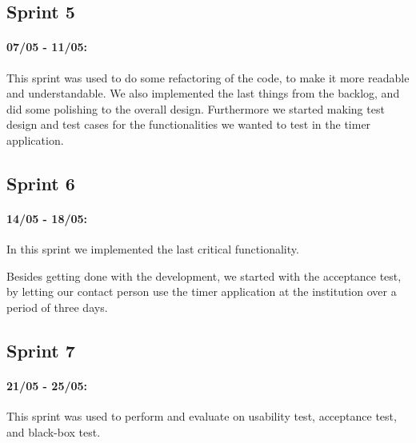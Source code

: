 \subsection*{Sprint 5}
\paragraph{07/05 - 11/05:}
This sprint was used to do some refactoring of the code, to make it more readable and understandable. We also implemented the last things from the backlog, and did some polishing to the overall design. Furthermore we started making test design and test cases for the functionalities we wanted to test in the timer application.

\subsection*{Sprint 6}
\paragraph{14/05 - 18/05:}
In this sprint we implemented the last critical functionality.

Besides getting done with the development, we started with the acceptance test, by letting our contact person use the timer application at the institution over a period of three days.
	
\subsection*{Sprint 7}
\paragraph{21/05 - 25/05:}
This sprint was used to perform and evaluate on usability test, acceptance test, and black-box test.